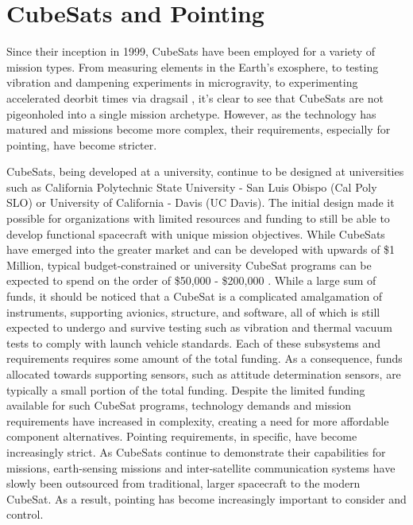\section*{CubeSats and Pointing}

\par \qquad Since their inception in 1999, CubeSats have been employed for a variety of mission types. 
From measuring elements in the Earth's exosphere, to testing vibration and dampening experiments in microgravity, to experimenting accelerated deorbit times via dragsail \cite{PolySat}, it's clear to see that CubeSats are not pigeonholed into a single mission archetype.
However, as the technology has matured and missions become more complex, their requirements, especially for pointing, have become stricter.

\par \qquad CubeSats, being developed at a university, continue to be designed at universities such as California Polytechnic State University - San Luis Obispo (Cal Poly SLO) or University of California - Davis (UC Davis).
The initial design made it possible for organizations with limited resources and funding to still be able to develop functional spacecraft with unique mission objectives. 
While CubeSats have emerged into the greater market and can be developed with upwards of \$1 Million, typical budget-constrained or university CubeSat programs can be expected to spend on the order of \$50,000 - \$200,000 \cite{SmallSatMarket}.
While a large sum of funds, it should be noticed that a CubeSat is a complicated amalgamation of instruments, supporting avionics, structure, and software, all of which is still expected to undergo and survive testing such as vibration and thermal vacuum tests to comply with launch vehicle standards.
Each of these subsystems and requirements requires some amount of the total funding.
As a consequence, funds allocated towards supporting sensors, such as attitude determination sensors, are typically a small portion of the total funding. 
Despite the limited funding available for such CubeSat programs, technology demands and mission requirements have increased in complexity, creating a need for more affordable component alternatives.
Pointing requirements, in specific, have become increasingly strict.
As CubeSats continue to demonstrate their capabilities for missions, earth-sensing missions and inter-satellite communication systems have slowly been outsourced from traditional, larger spacecraft to the modern CubeSat.
As a result, pointing has become increasingly important to consider and control.

